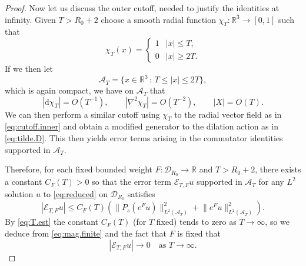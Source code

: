 \documentclass{article}
\theoremstyle{definition}
\numberwithin{thm}{section}
\numberwithin{equation}{section}
\def\R{\mathbb{R}}
\newcommand{\dd}{\mathrm d}
\newcommand{\norm}[1]{\lVert #1\rVert}
\begin{document}
\begin{proof}
Now let us discuss the outer cutoff, needed to justify the identities at infinity. Given $T>R_0+2$ choose a smooth radial function $\chi_T:\R^3\to [0,1]$ such that
\begin{equation}
\chi_T(x)=\left\{\begin{array}{cl} 1 & |x|\leq T, \\
0 & |x|\geq 2T.\end{array}\right.
\end{equation}
If we then let
\begin{equation}\label{eq:outer.annulus}
    \mathcal{A}_T=\{x\in\R^3\,:\,T\leq|x|\leq 2T\},
\end{equation}
which is again compact, we have on $\mathcal{A}_T$ that
\begin{equation}\label{eq:T.est}
    |\dd\chi_T|=O(T^{-1}),\qquad
    |\nabla^2\chi_T|=O(T^{-2}),\qquad
    |X|=O(T).
\end{equation}
We can then perform a similar cutoff using $\chi_T$ to the radial vector field as in \eqref{eq:cutoff.inner} and obtain a modified generator to the dilation action as in \eqref{eq:tilde.D}.  This then yields error terms arising in the commutator identities supported in $\mathcal{A}_T$.

Therefore, for each fixed bounded weight $F:\mathcal{D}_{R_0}\to\R$ and $T>R_0+2$, there exists a constant $C_F(T)>0$ so that the error term $\mathcal{E}_{T,F}u$ supported in $\mathcal{A}_T$ for any $L^2$ solution $u$ to \eqref{eq:reduced} on $\mathcal{D}_{R_0}$ satisfies  
\begin{equation} 
    |\mathcal E_{T,F}u|
    \leq C_F(T)\left(
       \norm{P_s(e^Fu)}_{L^2(\mathcal{A}_T)}^2
       +\norm{e^Fu}_{L^2(\mathcal{A}_T)}^2
    \right).
\end{equation}
By \eqref{eq:T.est} the constant $C_F(T)$ (for $T$ fixed) tends to zero as $T\to\infty$, so we deduce from \eqref{eq:mag.finite} and the fact that $F$ is fixed that
 \begin{equation}\label{eq:escaping-remainder}
    |\mathcal E_{T,F}u|\to 0\quad\text{as $T\to\infty$.}
 \end{equation}


\end{proof}
\end{document}
